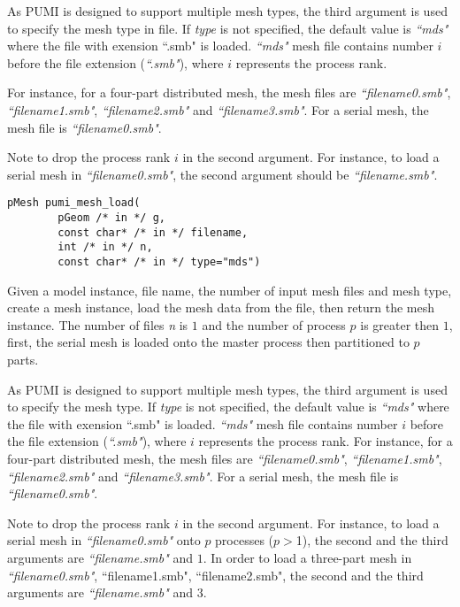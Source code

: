 As PUMI is designed to support multiple mesh types, the third argument is used to specify the mesh type in file. If \emph{type} is not specified, the default value is \emph{``mds"} where the file with exension {``.smb"} is loaded. \emph{``mds"} mesh file contains number $i$ before the file extension (\emph{``.smb"}), where $i$ represents the process rank. 

For instance, for a four-part distributed mesh, the mesh files are \emph{``filename0.smb"}, \emph{``filename1.smb"}, \emph{``filename2.smb"} and \emph{``filename3.smb"}. For a serial mesh, the mesh file is \emph{``filename0.smb"}. 

Note to drop the process rank $i$ in the second argument. For instance, to load a serial mesh in \emph{``filename0.smb"}, the second argument should be \emph{``filename.smb"}.

\begin{verbatim}
pMesh pumi_mesh_load(
        pGeom /* in */ g, 
        const char* /* in */ filename, 
        int /* in */ n, 
        const char* /* in */ type="mds")
\end{verbatim}\vspace{-.5cm}\hspace{1cm}   	
	Given a model instance, file name, the number of input mesh files and mesh type, create a mesh instance, load the mesh data from the file, then return the mesh instance. The number of files \emph{n} is $1$ and the number of process $p$ is greater then $1$, first, the serial mesh is loaded onto the master process then partitioned to $p$ parts. 

As PUMI is designed to support multiple mesh types, the third argument is used to specify the mesh type. If \emph{type} is not specified, the default value is \emph{``mds"} where the file with exension {``.smb"} is loaded. \emph{``mds"} mesh file contains number $i$ before the file extension (\emph{``.smb"}), where $i$ represents the process rank. For instance, for a four-part distributed mesh, the mesh files are \emph{``filename0.smb"}, \emph{``filename1.smb"}, \emph{``filename2.smb"} and \emph{``filename3.smb"}. For a serial mesh, the mesh file is \emph{``filename0.smb"}. 

Note to drop the process rank $i$ in the second argument. For instance, to load a serial mesh in \emph{``filename0.smb"} onto $p$ processes ($p$$>$1), the second and the third arguments are \emph{``filename.smb"} and $1$. In order to load a three-part mesh in \emph{``filename0.smb"}, {``filename1.smb"}, {``filename2.smb"}, the second and the third arguments are \emph{``filename.smb"} and $3$.

